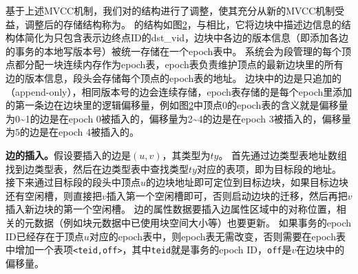 \begin{figure}[htb]
\label{epoch}
\end{figure}

基于上述MVCC机制，我们对\store 的结构进行了调整，使其充分从新的MVCC机制受益，调整后的存储结构称为\newstore。
\newstore 的结构如图\ref{newseg}，与\store 相比，它将边块中描述边信息的结构体简化为只包含表示边终点ID的dst\_vid，边块中各边的版本信息（即添加各边的事务的本地写版本号）被统一存储在一个epoch表中。
系统会为段管理的每个顶点都分配一块连续内存作为epoch表，epoch表负责维护顶点的最新边块里的所有边的版本信息，段头会存储每个顶点的epoch表的地址。
边块中的边是只追加的（append-only），相同版本号的边会连续存储，epoch表存储的是每个epoch里添加的第一条边在边块里的逻辑偏移量，例如图\ref{newseg}中顶点0的epoch表的含义就是偏移量为0\textasciitilde 1的边是在epoch 0被插入的，偏移量为2\textasciitilde 4的边是在epoch 3被插入的，偏移量为$5$的边是在epoch 4被插入的。

\begin{figure}[htb]
\label{newseg} 
\end{figure}


\textbf{边的插入。}假设要插入的边是$(u, v)$，其类型为$ty$。
首先通过边类型表地址数组找到边类型表，然后在边类型表中查找类型$ty$对应的表项，即为目标段的地址。
接下来通过目标段的段头中顶点$u$的边块地址即可定位到目标边块，如果目标边块还有空闲槽，则直接把$v$插入第一个空闲槽即可，否则启动边块的迁移，然后再把$v$插入新边块的第一个空闲槽。
边的属性数据要插入边属性区域中的对称位置，相关的元数据（例如块元数据中已使用块空间大小等）也要更新。
如果事务的epoch ID已经存在于顶点$u$对应的epoch表中，则epoch表无需改变，否则需要在epoch表中增加一个表项\texttt{<teid,off>}，其中\texttt{teid}就是事务的epoch ID，\texttt{off}是$v$在边块中的偏移量。

